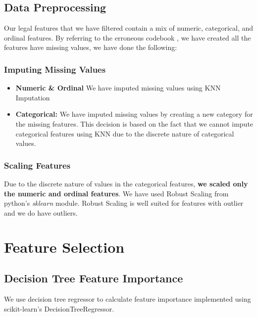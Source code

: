 \documentclass{article}
\begin{document}
\subsection{Data Preprocessing}
Our legal features that we have filtered contain a mix of numeric, categorical, and ordinal features. By referring to the erroneous codebook , we have created all the features have missing values, we have done the following:


\subsubsection{Imputing Missing Values}
\begin{itemize}
\item \textbf{Numeric \& Ordinal} We have imputed missing values using KNN Imputation
\item \textbf{Categorical:} We have imputed missing values by creating a new category for the missing features. This decision is based on the fact that we cannot impute categorical features using KNN due to the discrete nature of categorical values.
\end{itemize}

\subsubsection{Scaling Features}
Due to the discrete nature of values in the categorical features, \textbf{we scaled only the numeric and ordinal features}. We have used Robust Scaling from python's \textit{sklearn} module. Robust Scaling is well suited for features with outlier and we do have outliers.

%


\section{Feature Selection}
\subsection{Decision Tree Feature Importance}
We use decision tree regressor to calculate feature importance implemented using scikit-learn's DecisionTreeRegressor.
\end{document}
